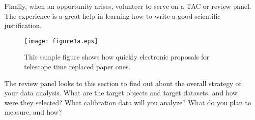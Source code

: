 \documentclass[11pt]{article}
\begin{document}
Finally, when an opportunity arises, volunteer to serve on
a TAC or review panel.  The experience is a great help in
learning how to write a good scientific justification.



\begin{figure}[hbt]
\texttt{[image: figure1a.eps]}
\caption{This sample figure shows how quickly electronic proposals
for telescope time replaced paper ones.}
\end{figure}


\clearpage


%

%

\expdesign
The review panel looks to this section to find out about the overall
strategy of your data analysis.  What are the target objects and target datasets, and how were they selected?  What calibration data will you analyze?  What do you plan to measure, and how?  

 
\end{document}
